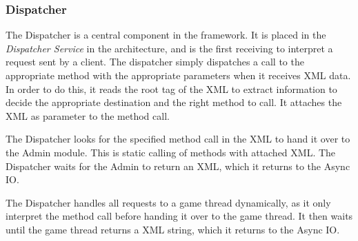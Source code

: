 \subsubsection{Dispatcher}\label{subsec:dispatcherdesign}
The Dispatcher is a central component in the framework. It is placed in the \textit{Dispatcher Service} in the architecture, and is the first receiving to interpret a request sent by a client. The dispatcher simply dispatches a call to the appropriate method with the appropriate parameters when it receives XML data. In order to do this, it reads the root tag of the XML to extract information to decide the appropriate destination and the right method to call. It attaches the XML as parameter to the method call.

The Dispatcher looks for the specified method call in the XML to hand it over to the Admin module. This is static calling of methods with attached XML. The Dispatcher waits for the Admin to return an XML, which it returns to the Async IO.

The Dispatcher handles all requests to a game thread dynamically, as it only interpret the method call before handing it over to the game thread. It then waits until the game thread returns a XML string, which it returns to the Async IO.